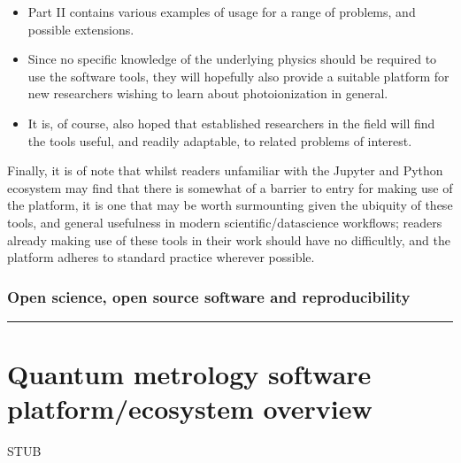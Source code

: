 \documentclass[letterpaper,table,10pt,english]{jupyterBook}
\begin{document}
\begin{enumerate}
\begin{itemize}
\item {} 
\sphinxAtStartPar
Part II contains various examples of usage for a range of problems, and possible extensions.

\item {} 
\sphinxAtStartPar
Since no specific knowledge of the underlying physics should be required to use the software tools, they will hopefully also provide a suitable platform for new researchers wishing to learn about photoionization in general.

\item {} 
\sphinxAtStartPar
It is, of course, also hoped that established researchers in the field will find the tools useful, and readily adaptable, to related problems of interest.

\end{itemize}

\end{enumerate}

\sphinxAtStartPar
Finally, it is of note that whilst readers unfamiliar with the Jupyter and Python ecosystem may find that there is somewhat of a barrier to entry for making use of the platform, it is one that may be worth surmounting given the ubiquity of these tools, and general usefulness in modern scientific/data\sphinxhyphen{}science workflows; readers already making use of these tools in their work should have no difficultly, and the platform adheres to standard practice wherever possible.


\subsection{Open science, open source software and reproducibility}
\label{\detokenize{part1/main_intro_051122:open-science-open-source-software-and-reproducibility}}

\bigskip\hrule\bigskip


\sphinxstepscope


\chapter{Quantum metrology software platform/ecosystem overview}
\label{\detokenize{part1/platform_intro_071122:quantum-metrology-software-platform-ecosystem-overview}}\label{\detokenize{part1/platform_intro_071122:chpt-platformintro}}\label{\detokenize{part1/platform_intro_071122::doc}}
\sphinxAtStartPar
STUB
\end{document}
